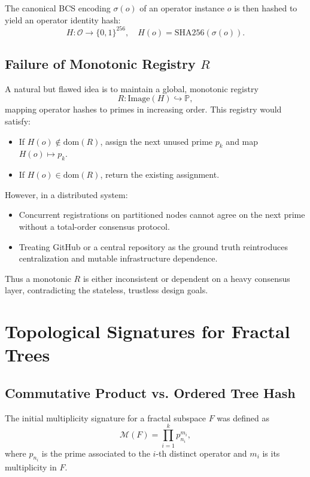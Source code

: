 \documentclass[11pt]{article}
\begin{document}
The canonical BCS encoding \( \sigma(o) \) of an operator instance \( o \) is then hashed to yield an operator identity hash:
\[
  H : \mathcal{O} \to \{0,1\}^{256}, \quad H(o) = \mathrm{SHA256}(\sigma(o)).
\]

\subsection{Failure of Monotonic Registry \( R \)}

A natural but flawed idea is to maintain a global, monotonic registry
\[
  R: \mathrm{Image}(H) \hookrightarrow \mathbb{P},
\]
mapping operator hashes to primes in increasing order. This registry would satisfy:

\begin{itemize}[leftmargin=*]
  \item If \( H(o) \notin \mathrm{dom}(R) \), assign the next unused prime \( p_k \) and map \( H(o) \mapsto p_k \).
  \item If \( H(o) \in \mathrm{dom}(R) \), return the existing assignment.
\end{itemize}

However, in a distributed system:

\begin{itemize}[leftmargin=*]
  \item Concurrent registrations on partitioned nodes cannot agree on the next prime without a total-order consensus protocol.
  \item Treating GitHub or a central repository as the ground truth reintroduces centralization and mutable infrastructure dependence.
\end{itemize}

Thus a monotonic \( R \) is either inconsistent or dependent on a heavy consensus layer, contradicting the stateless, trustless design goals.

\section{Topological Signatures for Fractal Trees}

\subsection{Commutative Product vs. Ordered Tree Hash}

The initial multiplicity signature for a fractal subspace \( F \) was defined as
\[
  \mathcal{M}(F) = \prod_{i=1}^k p_{n_i}^{m_i},
\]
where \( p_{n_i} \) is the prime associated to the \(i\)-th distinct operator and \( m_i \) is its multiplicity in \( F \).
\end{document}

